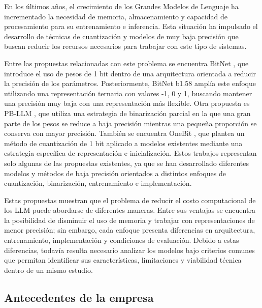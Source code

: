 
En los últimos años, el crecimiento de los Grandes Modelos de Lenguaje ha incrementado la necesidad de memoria, almacenamiento y capacidad de procesamiento para su entrenamiento e inferencia. Esta situación ha impulsado el desarrollo de técnicas de cuantización y modelos de muy baja precisión que buscan reducir los recursos necesarios para trabajar con este tipo de sistemas.

Entre las propuestas relacionadas con este problema se encuentra BitNet \cite{bitnet2023}, que introduce el uso de pesos de 1 bit dentro de una arquitectura orientada a reducir la precisión de los parámetros. Posteriormente, BitNet b1.58 \cite{bitnet1582024} amplía este enfoque utilizando una representación ternaria con valores -1, 0 y 1, buscando mantener una precisión muy baja con una representación más flexible. Otra propuesta es PB-LLM \cite{pbllm2024}, que utiliza una estrategia de binarización parcial en la que una gran parte de los pesos se reduce a baja precisión mientras una pequeña proporción se conserva con mayor precisión. También se encuentra OneBit \cite{onebit2024}, que plantea un método de cuantización de 1 bit aplicado a modelos existentes mediante una estrategia específica de representación e inicialización. Estos trabajos representan solo algunas de las propuestas existentes, ya que se han desarrollado diferentes modelos y métodos de baja precisión orientados a distintos enfoques de cuantización, binarización, entrenamiento e implementación.

Estas propuestas muestran que el problema de reducir el costo computacional de los LLM puede abordarse de diferentes maneras. Entre sus ventajas se encuentra la posibilidad de disminuir el uso de memoria y trabajar con representaciones de menor precisión; sin embargo, cada enfoque presenta diferencias en arquitectura, entrenamiento, implementación y condiciones de evaluación. Debido a estas diferencias, todavía resulta necesario analizar los modelos bajo criterios comunes que permitan identificar sus características, limitaciones y viabilidad técnica dentro de un mismo estudio.

\subsection{Antecedentes de la empresa} \label{sec:antecedentes_empresa} %

